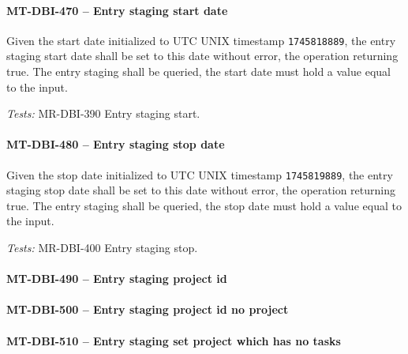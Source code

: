 \paragraph{MT-DBI-470 -- Entry staging start date}
Given the start date initialized to UTC UNIX timestamp
\lstinline{1745818889}, the entry staging start date shall be
set to this date without error, the operation returning true.
The entry staging shall be queried, the start date must hold
a value equal to the input.

\textit{Tests: } MR-DBI-390 Entry staging start.

\paragraph{MT-DBI-480 -- Entry staging stop date}
Given the stop date initialized to UTC UNIX timestamp
\lstinline{1745819889}, the entry staging stop date shall be
set to this date without error, the operation returning true.
The entry staging shall be queried, the stop date must hold
a value equal to the input.

\textit{Tests: } MR-DBI-400 Entry staging stop.

\paragraph{MT-DBI-490 -- Entry staging project id}

\paragraph{MT-DBI-500 -- Entry staging project id no project}

\paragraph{MT-DBI-510 -- Entry staging set project which has no tasks}
